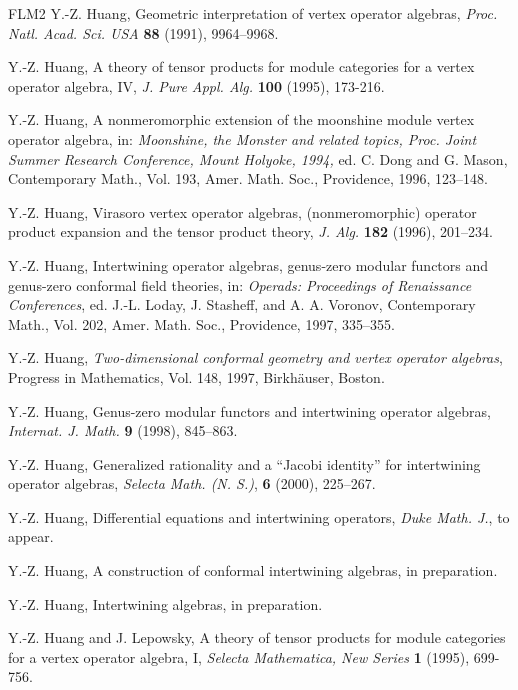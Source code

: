 \documentclass{amsproc}
\theoremstyle{definition}
\theoremstyle{remark}
\numberwithin{equation}{section}
\begin{document}
\begin{thebibliography}{FLM2}
Y.-Z. Huang,
Geometric interpretation of vertex operator algebras,
{\em Proc. Natl. Acad. Sci. USA} {\bf 88} (1991), 9964--9968.


Y.-Z. Huang, A theory of tensor products for module categories
for a vertex operator algebra, IV, {\em J. Pure Appl. Alg.} {\bf 100}
(1995), 173-216.

Y.-Z. Huang, A nonmeromorphic extension of the moonshine module 
vertex operator algebra, in: {\em Moonshine, the Monster
and related topics, Proc. Joint Summer Research Conference, 
Mount Holyoke, 1994,} ed. C. Dong and G. Mason, 
Contemporary Math., Vol. 193, Amer. Math. Soc., Providence, 1996, 
123--148.

Y.-Z. Huang, Virasoro vertex operator algebras,
(nonmeromorphic) operator product expansion and the tensor product
theory, {\em J. Alg.} {\bf 182} (1996), 201--234.

Y.-Z. Huang, Intertwining operator algebras, genus-zero modular
functors and genus-zero conformal field theories,  in: {\em Operads:
Proceedings of Renaissance Conferences}, ed. J.-L. Loday,
J. Stasheff, and A. A. Voronov, Contemporary Math., Vol. 202,
Amer. Math. Soc., Providence, 1997,  335--355.

Y.-Z. Huang, 
{\em Two-dimensional conformal geometry and vertex operator algebras}, 
Progress in Mathematics, Vol. 148, 1997,
Birkh\"{a}user, Boston.


Y.-Z. Huang, Genus-zero modular functors and intertwining operator algebras,
{\em Internat. J. Math.} {\bf 9} (1998), 845--863.


Y.-Z. Huang, Generalized rationality and a
``Jacobi identity'' for intertwining operator algebras,
{\em Selecta Math. (N. S.)}, {\bf 6} (2000),  225--267. 


Y.-Z. Huang, Differential equations and  
intertwining operators, {\em Duke Math. J.}, to appear.


Y.-Z. Huang,  A construction of conformal intertwining 
algebras, in preparation. 

Y.-Z. Huang, Intertwining algebras, in preparation. 



Y.-Z. Huang and J. Lepowsky, A theory of tensor products for module
categories for a vertex operator algebra, I, {\em Selecta
Mathematica, New Series} {\bf 1} (1995), 699-756.


\end{thebibliography}
\end{document}

